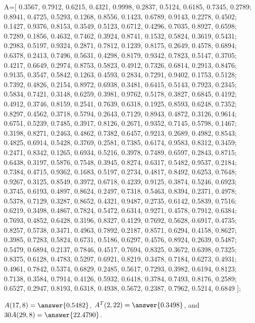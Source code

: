 \documentclass{ximera}
\begin{document}
\begin{problem}
\begin{hint}
    A=[
  0.3567, 0.7912, 0.6215, 0.4321, 0.9998, 0.2837, 0.5124, 0.6185, 0.7345, 0.2789;
  0.8941, 0.4725, 0.5293, 0.1268, 0.8556, 0.1423, 0.6789, 0.9143, 0.2278, 0.4502;
  0.1427, 0.9376, 0.8153, 0.3549, 0.5123, 0.6712, 0.4296, 0.7035, 0.8927, 0.6598;
  0.7289, 0.1856, 0.4632, 0.7462, 0.3924, 0.8741, 0.1532, 0.5824, 0.3619, 0.5431;
  0.2983, 0.5197, 0.9324, 0.2871, 0.7812, 0.1239, 0.8175, 0.2649, 0.4578, 0.6894;
  0.6378, 0.2413, 0.7496, 0.5631, 0.4298, 0.8179, 0.9342, 0.7823, 0.5147, 0.3705;
  0.4217, 0.6649, 0.2974, 0.8753, 0.5823, 0.4912, 0.7326, 0.6814, 0.2913, 0.8476;
  0.9135, 0.3547, 0.5842, 0.1263, 0.4593, 0.2834, 0.7291, 0.9402, 0.1753, 0.5128;
  0.7392, 0.4826, 0.2154, 0.8972, 0.6938, 0.3481, 0.6415, 0.5143, 0.7923, 0.2345;
  0.5834, 0.7421, 0.3148, 0.6259, 0.3981, 0.9762, 0.5178, 0.3827, 0.6845, 0.4192;
  0.4912, 0.3746, 0.8159, 0.2541, 0.7639, 0.6318, 0.1925, 0.8593, 0.6248, 0.7352;
  0.8297, 0.4562, 0.3718, 0.5794, 0.2643, 0.7129, 0.8943, 0.4872, 0.3126, 0.9614;
  0.6751, 0.5239, 0.7485, 0.3917, 0.8126, 0.2671, 0.9352, 0.7145, 0.5798, 0.1467;
  0.3198, 0.8271, 0.2463, 0.4862, 0.7382, 0.6457, 0.9213, 0.2689, 0.4982, 0.8543;
  0.4825, 0.6914, 0.5428, 0.3769, 0.2581, 0.7385, 0.6174, 0.9583, 0.8312, 0.3459;
  0.2471, 0.8342, 0.1265, 0.6934, 0.5216, 0.3978, 0.7489, 0.6597, 0.2843, 0.8715;
  0.6438, 0.3197, 0.5876, 0.7548, 0.3945, 0.8274, 0.6317, 0.5482, 0.9537, 0.2184;
  0.7384, 0.4715, 0.9362, 0.1683, 0.5197, 0.2734, 0.4817, 0.8492, 0.6253, 0.7648;
  0.9267, 0.3125, 0.8549, 0.3972, 0.6718, 0.4239, 0.9125, 0.3874, 0.5246, 0.6923;
  0.3745, 0.6193, 0.4897, 0.8624, 0.2497, 0.7318, 0.5463, 0.8394, 0.2371, 0.4978;
  0.5378, 0.7129, 0.3287, 0.8652, 0.4321, 0.9487, 0.2735, 0.6142, 0.5839, 0.7516;
    0.6219, 0.3498, 0.4867, 0.7824, 0.5472, 0.6314, 0.9271, 0.4578, 0.7912, 0.6384;
    0.7693, 0.4852, 0.6428, 0.3196, 0.8327, 0.4129, 0.7692, 0.5628, 0.6917, 0.4735;
    0.8257, 0.5738, 0.3471, 0.4963, 0.7892, 0.2187, 0.8571, 0.6294, 0.4158, 0.8627;
    0.3985, 0.7283, 0.5824, 0.6731, 0.5186, 0.6297, 0.4576, 0.8924, 0.2639, 0.5487;
    0.5479, 0.6894, 0.2137, 0.7846, 0.4517, 0.7694, 0.8325, 0.3672, 0.6398, 0.7325;
    0.8375, 0.6128, 0.4783, 0.5297, 0.6921, 0.8219, 0.3478, 0.7184, 0.6273, 0.4931;
    0.4961, 0.7842, 0.5374, 0.6829, 0.2485, 0.5617, 0.7293, 0.3982, 0.6194, 0.8123;
    0.7138, 0.3584, 0.7914, 0.4126, 0.5932, 0.6418, 0.3784, 0.7493, 0.8176, 0.2589;
    0.6527, 0.2947, 0.8193, 0.6318, 0.4938, 0.5672, 0.2387, 0.7962, 0.5214, 0.6849
];

  \end{hint}

$A(17,8)=\answer{0.5482}$, $A^T(2,22)=\answer{0.3498}$, and $30A(29,8)=\answer{22.4790}$.

\end{problem}
\end{document}
